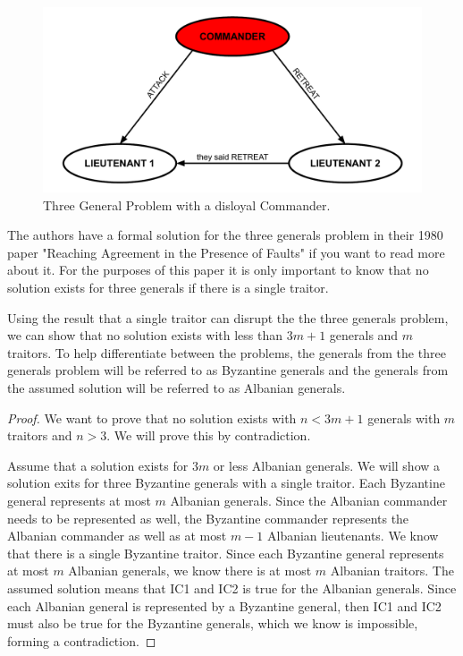 \documentclass[10pt]{amsart}
\begin{document}
\begin{figure}[h!]
    \centering
    \includegraphics[scale=.6]{../figures/three_generals_unloyal_commander.pdf}
    \caption{Three General Problem with a disloyal Commander.}
\end{figure}

The authors have a formal solution for the three generals problem in their 1980 paper "Reaching 
Agreement in the Presence of Faults" if you want to read more about it. For the purposes of this
paper it is only important to know that no solution exists for three generals if there is a single
traitor.

Using the result that a single traitor can disrupt the the three generals problem, we can show that
no solution exists with less than $3m+1$ generals and $m$ traitors. To help differentiate between
the problems, the generals from the three generals problem will be referred to as Byzantine generals
and the generals from the assumed solution will be referred to as Albanian generals.

\begin{proof}
    We want to prove that no solution exists with $n < 3m + 1$ generals with $m$ traitors and $n > 3$.
    We will prove this by contradiction. 

    Assume that a solution exists for $3m$ or less Albanian generals. We will show a solution exits
    for three Byzantine generals with a single traitor. Each Byzantine general represents at most 
    $m$ Albanian generals. Since the Albanian commander needs to be represented as well, the
    Byzantine commander represents the Albanian commander as well as at most $m-1$ Albanian lieutenants.
    We know that there is a single Byzantine traitor. Since each Byzantine general represents at
    most $m$ Albanian generals, we know there is at most $m$ Albanian traitors. The assumed solution
    means that IC1 and IC2 is true for the Albanian generals. Since each Albanian general is 
    represented by a Byzantine general, then IC1 and IC2 must also be true for the Byzantine generals,
    which we know is impossible, forming a contradiction.
\end{proof}
\end{document}
